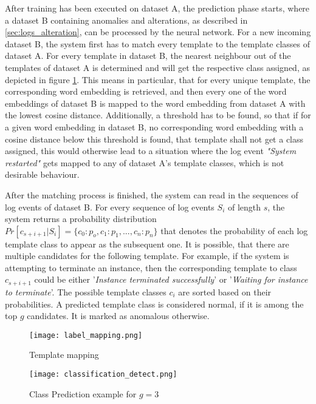After training has been executed on dataset A, the prediction phase starts, where a dataset B containing anomalies and alterations, as described in \ref{sec:logs_alteration}, can be processed by the neural network. For a new incoming dataset B, the system first has to match every template to the template classes of dataset A. For every template in dataset B, the nearest neighbour out of the templates of dataset A is determined and will get the respective class assigned, as depicted in figure \ref{fig:label_mapping}. This means in particular, that for every unique template, the corresponding word embedding is retrieved, and then every one of the word embeddings of dataset B is mapped to the word embedding from dataset A with the lowest cosine distance. Additionally, a threshold has to be found, so that if for a given word embedding in dataset B, no corresponding word embedding with a cosine distance below this threshold is found, that template shall not get a class assigned, this would otherwise lead to a situation where the log event \textit{"System restarted"} gets mapped to any of dataset A's template classes, which is not desirable behaviour.

After the matching process is finished, the system can read in the sequences of log events of dataset B. For every sequence of log events $S_i$ of length $s$, the system returns a probability distribution $Pr[c_{s+i+1}|S_i] = \{c_0 : p_o, c_1 : p_1, ..., c_n : p_n\}$ that denotes the probability of each log template class to appear as the subsequent one. It is possible, that there are multiple candidates for the following template. For example, if the system is attempting to terminate an instance, then the corresponding template to class $c_{s+i+1}$ could be either '\textit{Instance terminated successfully}' or '\textit{Waiting for instance to terminate}'. The possible template classes $c_i$ are sorted based on their probabilities. A predicted template class is considered normal, if it is among the top $g$ candidates. It is marked as anomalous otherwise.
 

\begin{figure}[H]
	\centering
	\captionsetup{justification=centering}
	\texttt{[image: label\_mapping.png]}
	\caption{Template mapping}
	\label{fig:label_mapping}
\end{figure}

\begin{figure}[H]
	\centering	
	\texttt{[image: classification\_detect.png]}
	\caption{Class Prediction example for $g=3$}
	\label{fig:class_prediction}
\end{figure}

